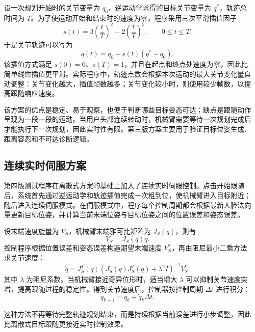 \documentclass[12pt,a4paper,UTF8]{article}
\begin{document}
设一次规划开始时的关节变量为 $q_0$，逆运动学求得的目标关节变量为 $q^{*}$，轨迹总时间为 $T$。为了使运动开始和结束时的速度为零，程序采用三次平滑插值因子
\begin{equation}
    s(t)=3\left(\frac{t}{T}\right)^2
    -2\left(\frac{t}{T}\right)^3,
    \qquad 0\leq t\leq T .
\end{equation}
于是关节轨迹可以写为
\begin{equation}
    q(t)=q_0+s(t)(q^{*}-q_0).
\end{equation}
该插值方式满足 $s(0)=0$、$s(T)=1$，并且在起点和终点处速度为零，因此比简单线性插值更平滑。实际程序中，轨迹点数会根据本次运动的最大关节变化量自动调整：关节变化越大，插值帧数越多；关节变化较小时，则使用较少帧数，以提高跟随响应速度。

该方案的优点是稳定、易于观察，也便于判断哪些目标姿态可达；缺点是跟随动作呈现为一段一段的运动。当用户头部连续转动时，机械臂需要等待一次规划完成后才能执行下一次规划，因此实时性有限。第三版方案主要用于验证目标位姿生成、距离容忍和不可达诊断逻辑。

\subsection{连续实时伺服方案}

第四版测试程序在离散式方案的基础上加入了连续实时伺服控制。点击开始跟随后，系统首先通过逆运动学和轨迹插值完成一次粗到位，使机械臂进入目标附近；随后进入连续伺服模式。在伺服模式中，程序每个控制周期都会根据最新人脸法向量更新目标位姿，并计算当前末端位姿与目标位姿之间的位置误差和姿态误差。

设末端速度旋量为 $V_S$，机械臂末端雅可比矩阵为 $J_S(q)$，则有
\begin{equation}
    V_S=J_S(q)\dot{q}.
\end{equation}
控制程序根据位置误差和姿态误差构造期望末端速度 $V_S^{*}$，再由阻尼最小二乘方法求关节速度：
\begin{equation}
    \dot{q}
    =
    J_S^T(q)
    \left(
        J_S(q)J_S^T(q)+\lambda^2 I
    \right)^{-1}
    V_S^{*}.
\end{equation}
其中 $\lambda$ 为阻尼系数。当机械臂接近奇异位形时，适当增大 $\lambda$ 可以抑制关节速度突增，提高跟随过程的稳定性。得到关节速度后，控制器按控制周期 $\Delta t$ 进行积分：
\begin{equation}
    q_{k+1}=q_k+\dot{q}_k\Delta t .
\end{equation}

这种方法不再等待完整轨迹规划结束，而是持续根据当前误差进行小步调整，因此比离散式目标跟随更接近实时控制效果。
\end{document}
